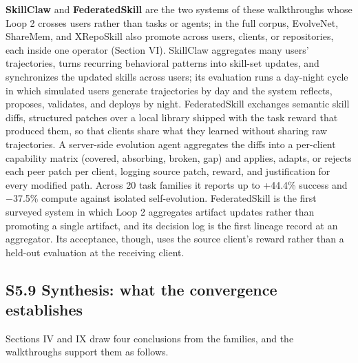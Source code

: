 \documentclass[
]{article}
\begin{document}
\textbf{SkillClaw} \cite{ma2026skillclaw} and \textbf{FederatedSkill}
\cite{yang2026federatedskill} are the two systems of these walkthroughs
whose Loop 2 crosses users rather than tasks or agents; in the full
corpus, EvolveNet, ShareMem, and XRepoSkill also promote across users,
clients, or repositories, each inside one operator (Section VI).
SkillClaw aggregates many users' trajectories, turns recurring
behavioral patterns into skill-set updates, and synchronizes the updated
skills across users; its evaluation runs a day-night cycle in which
simulated users generate trajectories by day and the system reflects,
proposes, validates, and deploys by night. FederatedSkill exchanges
semantic skill diffs, structured patches over a local library shipped
with the task reward that produced them, so that clients share what they
learned without sharing raw trajectories. A server-side evolution agent
aggregates the diffs into a per-client capability matrix (covered,
absorbing, broken, gap) and applies, adapts, or rejects each peer patch
per client, logging source patch, reward, and justification for every
modified path. Across 20 task families it reports up to +44.4\% success
and −37.5\% compute against isolated self-evolution. FederatedSkill is
the first surveyed system in which Loop 2 aggregates artifact updates
rather than promoting a single artifact, and its decision log is the
first lineage record at an aggregator. Its acceptance, though, uses the
source client's reward rather than a held-out evaluation at the
receiving client.

\subsection{S5.9 Synthesis: what the convergence
establishes}\label{s5.9-synthesis-what-the-convergence-establishes}

Sections IV and IX draw four conclusions from the families, and the
walkthroughs support them as follows.
\end{document}
